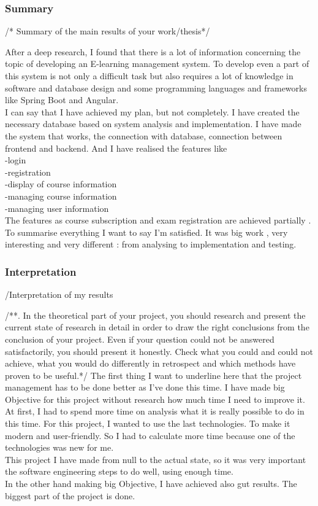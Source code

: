 \documentclass{scrartcl}
\begin{document}
\subsubsection{Summary}
/* Summary of the main results of your work/thesis*/

After a deep research, I found that there is a lot of information concerning the topic of developing an E-learning management system. To develop even a part of this system is not only a difficult task but also requires a lot of knowledge in software and database design and some programming languages and frameworks like Spring Boot and Angular. \\
I can say that I have achieved my plan, but not completely. I have created the necessary database based on system analysis and implementation. I  have made the system that works, the connection with database, connection between frontend and backend. And I have realised the features like \\
-login\\
-registration\\
-display of course information\\
-managing course information\\
-managing user information \\
The features as course subscription and exam registration are achieved partially .\\

To summarise everything I want to say I'm satisfied. It was big work , very interesting and very different : from analysing to implementation and testing.

 

\subsubsection{Interpretation }
/Interpretation of my results

/**. In the theoretical part of your project, you should research and present the current state of research in detail in order to draw the right conclusions from the conclusion of your project. Even if your question could not be answered satisfactorily, you should present it honestly. Check what you could and could not achieve, what you would do differently in retrospect and which methods have proven to be useful.*/
The first thing I want to underline here that the project management has to be done better as I've done this time. I have made big Objective for this project without research how much time I need to improve it.\\
At first, I had to spend more time on analysis what it is really possible to do in this time. For this project, I wanted to use the last technologies. To make it modern and user-friendly. So I had to calculate more time because one of the technologies was new for me. \\
This project I have made from null to the actual state, so it was very important the software engineering steps to do well, using enough time.\\
In the other hand making big Objective, I have achieved also gut results. The biggest part of the project is done.
\end{document}
